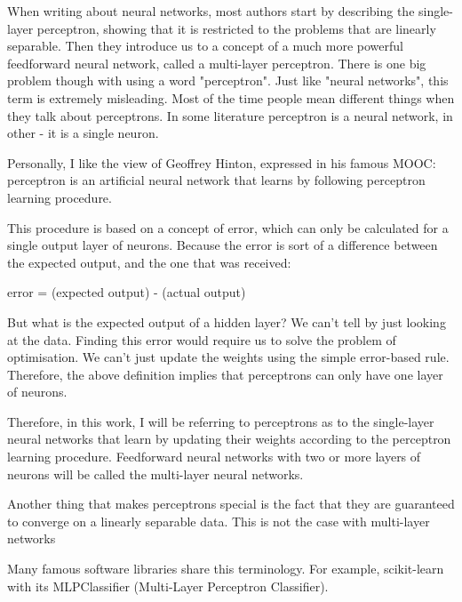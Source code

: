 When writing about neural networks, most authors start by describing the single-layer perceptron, showing that it is restricted to the problems that are linearly separable. Then they introduce us to a concept of a much more powerful feedforward neural network, called a multi-layer perceptron. There is one big problem though with using a word "perceptron". Just like "neural networks", this term is extremely misleading. Most of the time people mean different things when they talk about perceptrons. In some literature perceptron is a neural network, in other - it is a single neuron.

Personally, I like the view of Geoffrey Hinton, expressed in his famous MOOC: perceptron is an artificial neural network that learns by following perceptron learning procedure.

This procedure is based on a concept of error, which can only be calculated for a single output layer of neurons. Because the error is sort of a difference between the expected output, and the one that was received:

error = (expected output) - (actual output)

But what is the expected output of a hidden layer? We can't tell by just looking at the data. Finding this error would require us to solve the problem of optimisation. We can't just update the weights using the simple error-based rule. Therefore, the above definition implies that perceptrons can only have one layer of neurons.

Therefore, in this work, I will be referring to perceptrons as to the single-layer neural networks that learn by updating their weights according to the perceptron learning procedure. Feedforward neural networks with two or more layers of neurons will be called the multi-layer neural networks.

Another thing that makes perceptrons special is the fact that they are guaranteed to converge on a linearly separable data. This is not the case with multi-layer networks

Many famous software libraries share this terminology. For example, scikit-learn with its MLPClassifier (Multi-Layer Perceptron Classifier).
